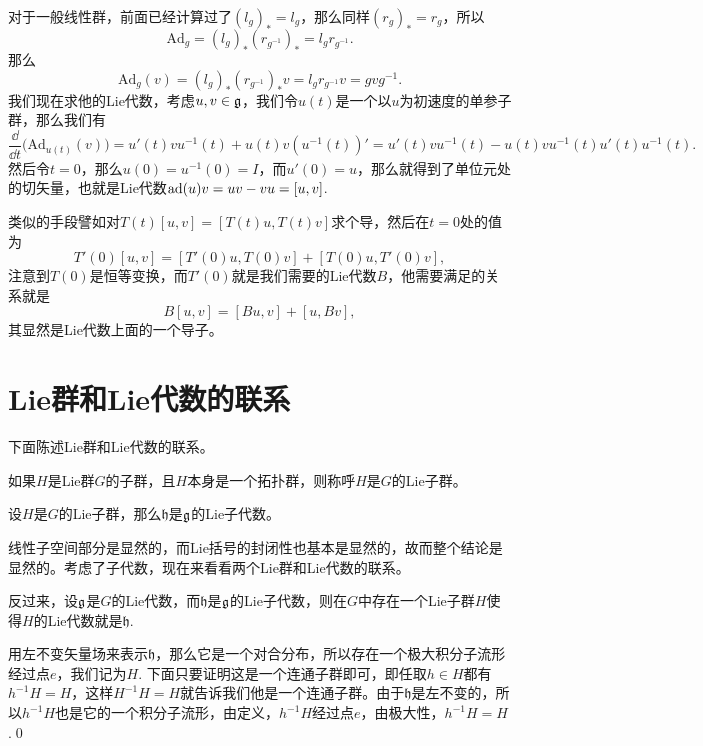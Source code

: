 
\para 对于一般线性群，前面已经计算过了$(l_g)_*=l_g$，那么同样$(r_g)_*=r_g$，所以
\[
	\mathrm{Ad}_g=(l_g)_*(r_{g^{-1}})_*=l_gr_{g^{-1}}.
\]
那么
\[
	\mathrm{Ad}_g(v)=(l_g)_*(r_{g^{-1}})_*v=l_gr_{g^{-1}}v=gvg^{-1}.
\]
我们现在求他的Lie代数，考虑$u,v\in {\mathfrak{g}}$，我们令$u(t)$是一个以$u$为初速度的单参子群，那么我们有
\[
	\frac{\dd}{\dd t}\bigl(\mathrm{Ad}_{u(t)}(v)\bigr)=u'(t)vu^{-1}(t)+u(t)v(u^{-1}(t))'=u'(t)vu^{-1}(t)-u(t)vu^{-1}(t)u'(t)u^{-1}(t).
\]
然后令$t=0$，那么$u(0)=u^{-1}(0)=I$，而$u'(0)=u$，那么就得到了单位元处的切矢量，也就是Lie代数$\operatorname{ad}(u)v=uv-vu=[u,v]$.

类似的手段譬如对$T(t)[u,v]=[T(t)u,T(t)v]$求个导，然后在$t=0$处的值为
\[
	T'(0)[u,v]=[T'(0)u,T(0)v]+[T(0)u,T'(0)v],
\]
注意到$T(0)$是恒等变换，而$T'(0)$就是我们需要的Lie代数$B$，他需要满足的关系就是
\[
	B[u,v]=[Bu,v]+[u,Bv],
\]
其显然是Lie代数上面的一个导子。

\section{Lie群和Lie代数的联系}

下面陈述Lie群和Lie代数的联系。

\para 如果$H$是Lie群$G$的子群，且$H$本身是一个拓扑群，则称呼$H$是$G$的Lie子群。

\para 设$H$是$G$的Lie子群，那么$\mathfrak{h}$是${\mathfrak{g}}$的Lie子代数。

线性子空间部分是显然的，而Lie括号的封闭性也基本是显然的，故而整个结论是显然的。考虑了子代数，现在来看看两个Lie群和Lie代数的联系。

\begin{pro}
反过来，设${\mathfrak{g}}$是$G$的Lie代数，而$\mathfrak{h}$是${\mathfrak{g}}$的Lie子代数，则在$G$中存在一个Lie子群$H$使得$H$的Lie代数就是$\mathfrak{h}$.
\end{pro}

\proof 用左不变矢量场来表示$\mathfrak{h}$，那么它是一个对合分布，所以存在一个极大积分子流形经过点$e$，我们记为$H$. 下面只要证明这是一个连通子群即可，即任取$h\in H$都有$h^{-1}H=H$，这样$H^{-1}H=H$就告诉我们他是一个连通子群。由于$\mathfrak{h}$是左不变的，所以$h^{-1}H$也是它的一个积分子流形，由定义，$h^{-1}H$经过点$e$，由极大性，$h^{-1}H=H$.\qed


